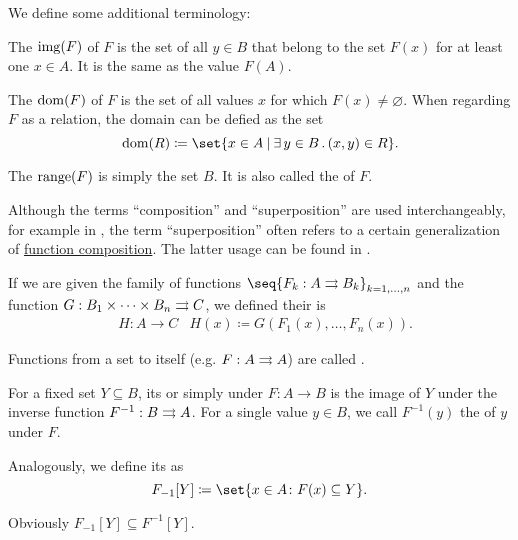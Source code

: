 \begin{definition}
  We define some additional terminology:
  \begin{thmenum}[resume=def:multi_valued_function]
     The  \( \operatorname{img}(F) \) of \( F \) is the set of all \( y \in B \) that belong to the set \( F(x) \) for at least one \( x \in A \). It is the same as the value \( F(A) \).

     The  \( \operatorname{dom}(F) \) of \( F \) is the set of all values \( x \) for which \( F(x) \neq \varnothing \). When regarding \( F \) as a relation, the domain can be defied as the set
    \begin{equation*}
      \dom(R) \coloneqq \set{ x \in A \given \qexists {y \in B} (x, y) \in R }.
    \end{equation*}

     The  \( \operatorname{range}(F) \) is simply the set \( B \). It is also called the  of \( F \).

     Although the terms \enquote{composition} and \enquote{superposition} are used interchangeably, for example in \cite[]{Фихтенгольц1968Том1}, the term \enquote{superposition} often refers to a certain generalization of \hyperref[def:multi_valued_function/composition]{function composition}. The latter usage can be found in \cite[16]{Яблонский1986}.

    If we are given the family of functions \( \seq{ F_k: A \multto B_k }_{k = 1, \ldots, n} \) and the function \( G: B_1 \times \cdots \times B_n \rightrightarrows C \), we defined their  is
    \begin{equation*}
      \begin{aligned}
        &H: A \to C
        &H(x) \coloneqq G(F_1(x), \ldots, F_n(x)).
      \end{aligned}
    \end{equation*}

     Functions from a set to itself (e.g. \( F: A \rightrightarrows A \)) are called .

     For a fixed set \( Y \subseteq B \), its  or simply  under \( F: A \to B \) is the image of \( Y \) under the inverse function \( F^{-1}: B \rightrightarrows A \). For a single value \( y \in B \), we call \( F^{-1}(y) \) the  of \( y \) under \( F \).

     Analogously, we define its  as
    \begin{equation*}
      F_{-1}[Y] \coloneqq \set{ x \in A \colon F(x) \subseteq Y }.
    \end{equation*}

    Obviously \( F_{-1}[Y] \subseteq F^{-1}[Y] \).
  \end{thmenum}
\end{definition}

